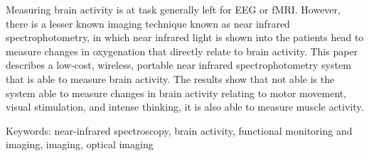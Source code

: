 
Measuring brain activity is at task generally left for EEG or fMRI. However, there is a lesser known imaging technique known as near infrared spectrophotometry, in which near infrared light is shown into the patients head to measure changes in oxygenation that directly relate to brain activity. This paper describes a low-cost, wireless, portable  near infrared spectrophotometry system that is able to measure brain activity. The results show that not able is the system able to measure changes in brain activity relating to motor movement, visual stimulation, and intense thinking, it is also able to measure muscle activity. 

\vspace{10mm}

\noindent Keywords: near-infrared spectroscopy, brain activity, functional monitoring and imaging, imaging, optical imaging